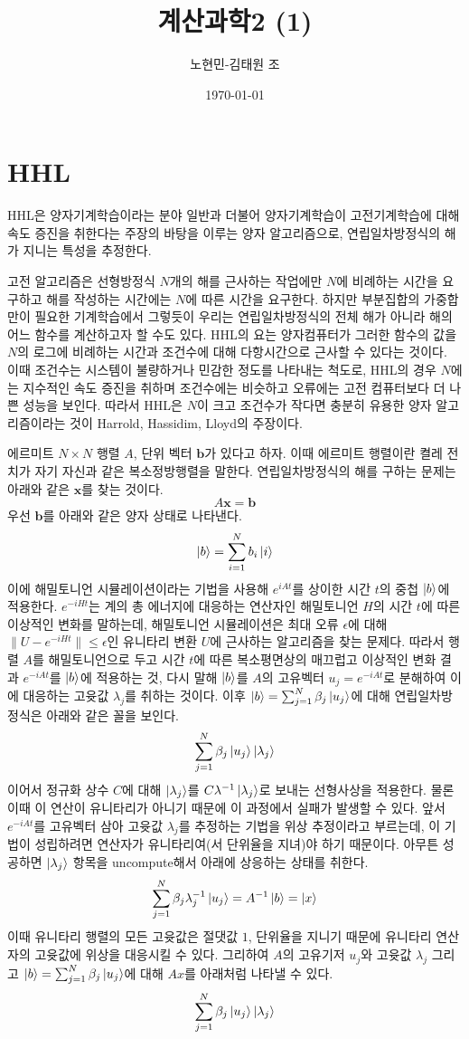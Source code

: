 \documentclass[a4paper,atbegshi,chapter,itemph,hidelinks]{oblivoir}
\title{계산과학2 (1)}
\author{노현민-김태원 조}
\date{\today}
\begin{document}
\maketitle
\tableofcontents
\chapter{HHL}
HHL은 양자기계학습이라는 분야 일반과 더불어 양자기계학습이 고전기계학습에 대해
속도 증진을 취한다는 주장의 바탕을 이루는 양자 알고리즘으로, 연립일차방정식의
해가 지니는 특성을 추정한다.

고전 알고리즘은 선형방정식 $N$개의 해를 근사하는 작업에만 $N$에 비례하는
시간을 요구하고 해를 작성하는 시간에는 $N$에 따른 시간을 요구한다. 하지만
부분집합의 가중합만이 필요한 기계학습에서 그렇듯이 우리는 연립일차방정식의 전체
해가 아니라 해의 어느 함수를 계산하고자 할 수도 있다. HHL의 요는 양자컴퓨터가
그러한 함수의 값을 $N$의 로그에 비례하는 시간과 조건수에 대해 다항시간으로 
근사할 수 있다는 것이다. 이때 조건수는 시스템이 불량하거나 민감한 정도를
나타내는 척도로, HHL의 경우 $N$에는 지수적인 속도 증진을 취하며 조건수에는
비슷하고 오류에는 고전 컴퓨터보다 더 나쁜 성능을 보인다. 따라서 HHL은 $N$이
크고 조건수가 작다면 충분히 유용한 양자 알고리즘이라는 것이 Harrold, Hassidim,
Lloyd의 주장이다.

에르미트 $N\times N$ 행렬 $A$, 단위 벡터 $\pmb{b}$가 있다고 하자. 이때 에르미트
행렬이란 켤레 전치가 자기 자신과 같은 복소정방행렬을 말한다. 연립일차방정식의
해를 구하는 문제는 아래와 같은 $\mathbf{x}$를 찾는 것이다.
\[
  A\pmb{x}=\pmb{b}
\]
우선 $\pmb{b}$를 아래와 같은 양자 상태로 나타낸다.
\[
  \ket{b} = \sum_{i=1}^N b_i\ket{i}
\]
이에 해밀토니언 시뮬레이션이라는 기법을 사용해 $e^{iAt}$를 상이한 시간 $t$의 중첩
$\ket{b}$에 적용한다. $e^{-iHt}$는 계의 총 에너지에 대응하는 연산자인 해밀토니언
$H$의 시간 $t$에 따른 이상적인 변화를 말하는데, 해밀토니언 시뮬레이션은 최대
오류 $\epsilon$에 대해 $\|U-e^{-iHt}\|\leq\epsilon$인 유니타리 변환 $U$에 
근사하는 알고리즘을 찾는 문제다. 따라서 행렬 $A$를 해밀토니언으로 두고
시간 $t$에 따른 복소평면상의 매끄럽고 이상적인 변화 결과 $e^{-iAt}$를 $\ket{b}$에
적용하는 것, 다시 말해 $\ket{b}$를 $A$의 고유벡터 $u_j=e^{-iAt}$로 분해하여 이에
대응하는 고윳값 $\lambda_j$를 취하는 것이다. 이후 $\ket{b}=\sum_{j=1}^N
\beta_j\ket{u_j}$에 대해 연립일차방정식은 아래와 같은 꼴을 보인다.
\[
  \sum_{j=1}^N\beta_j\ket{u_j}\ket{\lambda_j}
\]
이어서 정규화 상수 $C$에 대해 $\ket{\lambda_j}$를 $C\lambda^{-1}\ket{\lambda_j}$로
보내는 선형사상을 적용한다. 물론 이때 이 연산이 유니타리가 아니기 때문에 
이 과정에서 실패가 발생할 수 있다. 앞서 $e^{-iAt}$를 고유벡터 삼아 고윳값
$\lambda_j$를 추정하는 기법을 위상 추정이라고 부르는데, 이 기법이 성립하려면
연산자가 유니타리여(서 단위율을 지녀)야 하기 때문이다. 아무튼 성공하면 
$\ket{\lambda_j}$ 항목을 uncompute해서 아래에 상응하는 상태를 취한다.
\[
  \sum_{j=1}^N\beta_j\lambda_j^{-1}\ket{u_j}=A^{-1}\ket{b}=\ket{x}
\]
이때 유니타리 행렬의 모든 고윳값은 절댓값 $1$, 단위율을 지니기
때문에 유니타리 연산자의 고윳값에 위상을 대응시킬 수 있다. 그리하여 $A$의 
고유기저 $u_j$와 고윳값 $\lambda_j$ 그리고 $\ket{b}=\sum_{j=1}^N
\beta_j\ket{u_j}$에 대해 $Ax$를 아래처럼 나타낼 수 있다. 
\[
  \sum_{j=1}^N\beta_j\ket{u_j}\ket{\lambda_j}
\]
\end{document}
